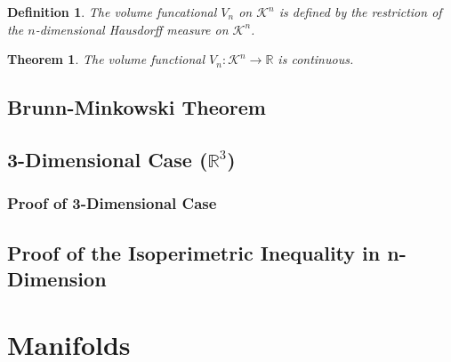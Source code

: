 \documentclass[a4paper]{book}
\newtheorem{theorem}{Theorem}%
\newtheorem{definition}{Definition}%
\begin{document}
\begin{definition}
	The volume funcational $V_{n}$ on $\mathscr{K}^{n}$ is defined by the restriction of the $n$-dimensional Hausdorff measure on $\mathscr{K}^{n}$.
\end{definition}

\begin{theorem}
	The volume functional $V_{n}:\mathscr{K}^{n}\to\mathbb{R}$ is continuous.
\end{theorem}

\section{Brunn-Minkowski Theorem}
\section{3-Dimensional Case ($\mathbb{R}^3$)}
\subsection{Proof of 3-Dimensional Case}
\section{Proof of the Isoperimetric Inequality in n-Dimension}

\chapter{Manifolds}



\end{document}
